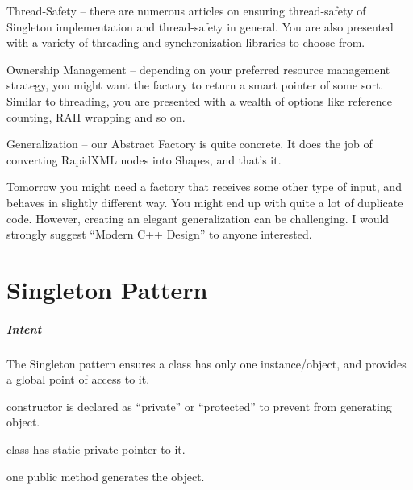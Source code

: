 \documentclass{book}
\begin{document}
    Thread-Safety – there are numerous articles on ensuring thread-safety of Singleton implementation and thread-safety in general.
    You are also presented with a variety of threading and synchronization libraries to choose from.

    Ownership Management – depending on your preferred resource management strategy, you might want the factory to return a smart pointer of some sort.
    Similar to threading, you are presented with a wealth of options like reference counting, RAII wrapping and so on.

    Generalization – our Abstract Factory is quite concrete. It does the job of converting RapidXML nodes into Shapes, and that’s it.

    Tomorrow you might need a factory that receives some other type of input, and behaves in slightly different way.
    You might end up with quite a lot of duplicate code. However, creating an elegant generalization can be challenging. I would strongly suggest “Modern C++ Design” to anyone interested.
\chapter{Singleton Pattern}\label{SingletonPattern}
\paragraph{Intent}
The Singleton pattern ensures a class has only one instance/object, and provides a global point of access to it.

constructor is declared as ``private'' or ``protected'' to prevent from generating object.

class has static private pointer to it.

one public method generates the object.
\end{document}
